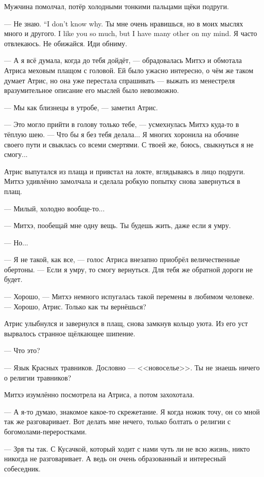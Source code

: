 Мужчина помолчал, потёр холодными тонкими пальцами щёки подруги.

{--- Не знаю.}
{``I don't know why.}
{Ты мне очень нравишься, но в моих мыслях много и другого.}
{I like you so much, but I have many other on my mind.}
Я часто отвлекаюсь.
Не обижайся.
Иди обниму.

--- А я всё думала, когда до тебя дойдёт, --- обрадовалась Митхэ и обмотала Атриса меховым плащом с головой.
Ей было ужасно интересно, о чём же таком думает Атрис, но она уже перестала спрашивать --- выжать из менестреля вразумительное описание его мыслей было невозможно.

--- Мы как близнецы в утробе, --- заметил Атрис.

--- Это могло прийти в голову только тебе, --- усмехнулась Митхэ куда-то в тёплую шею.
--- Что бы я без тебя делала...
Я многих хоронила на обочине своего пути и свыклась со всеми смертями.
С твоей же, боюсь, свыкнуться я не смогу...

Атрис выпутался из плаща и привстал на локте, вглядываясь в лицо подруги.
Митхэ удивлённо замолчала и сделала робкую попытку снова завернуться в плащ.

--- Милый, холодно вообще-то...

--- Митхэ, пообещай мне одну вещь.
Ты будешь жить, даже если я умру.

--- Но...

--- Я не такой, как все, --- голос Атриса внезапно приобрёл величественные обертоны.
--- Если я умру, то смогу вернуться.
Для тебя же обратной дороги не будет.

--- Хорошо, --- Митхэ немного испугалась такой перемены в любимом человеке.
--- Хорошо, Атрис.
Только как ты вернёшься?

Атрис улыбнулся и завернулся в плащ, снова замкнув кольцо уюта.
Из его уст вырвалось странное щёлкающее шипение.

--- Что это?

--- Язык Красных травников.
Дословно --- <<новоселье>>.
Ты не знаешь ничего о религии травников?

Митхэ изумлённо посмотрела на Атриса, а потом захохотала.

--- А я-то думаю, знакомое какое-то скрежетание.
Я когда ножик точу, он со мной так же разговаривает.
Вот делать мне нечего, только болтать о религии с богомолами-переростками.

--- Зря ты так.
С Кусачкой, который ходит с нами чуть ли не всю жизнь, никто никогда не разговаривает.
А ведь он очень образованный и интересный собеседник.

